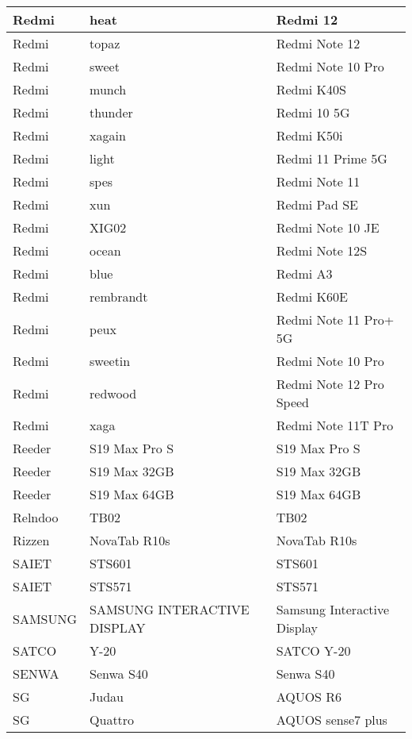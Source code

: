 \begin{tabularx}{\linewidth}{|l|X|X|}
        Redmi & heat & Redmi 12 \\ \hline
        Redmi & topaz & Redmi Note 12 \\ \hline
        Redmi & sweet & Redmi Note 10 Pro \\ \hline
        Redmi & munch & Redmi K40S \\ \hline
        Redmi & thunder & Redmi 10 5G \\ \hline
        Redmi & xagain & Redmi K50i \\ \hline
        Redmi & light & Redmi 11 Prime 5G \\ \hline
        Redmi & spes & Redmi Note 11 \\ \hline
        Redmi & xun & Redmi Pad SE \\ \hline
        Redmi & XIG02 & Redmi Note 10 JE \\ \hline
        Redmi & ocean & Redmi Note 12S \\ \hline
        Redmi & blue & Redmi A3 \\ \hline
        Redmi & rembrandt & Redmi K60E \\ \hline
        Redmi & peux & Redmi Note 11 Pro+ 5G \\ \hline
        Redmi & sweetin & Redmi Note 10 Pro \\ \hline
        Redmi & redwood & Redmi Note 12 Pro Speed \\ \hline
        Redmi & xaga & Redmi Note 11T Pro \\ \hline
        Reeder & S19 Max Pro S & S19 Max Pro S \\ \hline
        Reeder & S19 Max 32GB & S19 Max 32GB \\ \hline
        Reeder & S19 Max 64GB & S19 Max 64GB \\ \hline
        Relndoo & TB02 & TB02 \\ \hline
        Rizzen & NovaTab R10s & NovaTab R10s \\ \hline
        SAIET & STS601 & STS601 \\ \hline
        SAIET & STS571 & STS571 \\ \hline
        SAMSUNG & SAMSUNG INTERACTIVE DISPLAY & Samsung Interactive Display \\ \hline
        SATCO & Y-20 & SATCO Y-20 \\ \hline
        SENWA & Senwa S40 & Senwa S40 \\ \hline
        SG & Judau & AQUOS R6 \\ \hline
        SG & Quattro & AQUOS sense7 plus \\ \hline

\end{tabularx}
